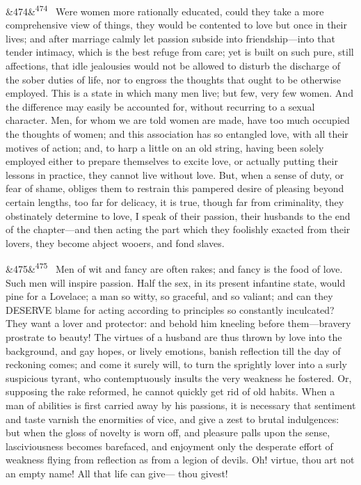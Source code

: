 \documentclass[12pt]{article}
\newcommand{\para}[1][]{\par\noindent\ifx&#1&\else\textsuperscript{\footnotesize #1}~\fi}
\begin{document}
\para[474] Were women more rationally educated, could they take a more comprehensive view of things, they would be contented to love but once in their lives; and after marriage calmly let passion subside into friendship---into that tender intimacy, which is the best refuge from care; yet is built on such pure, still affections, that idle jealousies would not be allowed to disturb the discharge of the sober duties of life, nor to engross the thoughts that ought to be otherwise employed. This is a state in which many men live; but few, very few women. And the difference may easily be accounted for, without recurring to a sexual character. Men, for whom we are told women are made, have too much occupied the thoughts of women; and this association has so entangled love, with all their motives of action; and, to harp a little on an old string, having been solely employed either to prepare themselves to excite love, or actually putting their lessons in practice, they cannot live without love. But, when a sense of duty, or fear of shame, obliges them to restrain this pampered desire of pleasing beyond certain lengths, too far for delicacy, it is true, though far from criminality, they obstinately determine to love, I speak of their passion, their husbands to the end of the chapter---and then acting the part which they foolishly exacted from their lovers, they become abject wooers, and fond slaves.

\para[475] Men of wit and fancy are often rakes; and fancy is the food of love. Such men will inspire passion. Half the sex, in its present infantine state, would pine for a Lovelace; a man so witty, so graceful, and so valiant; and can they DESERVE blame for acting according to principles so constantly inculcated? They want a lover and protector: and behold him kneeling before them---bravery prostrate to beauty! The virtues of a husband are thus thrown by love into the background, and gay hopes, or lively emotions, banish reflection till the day of reckoning comes; and come it surely will, to turn the sprightly lover into a surly suspicious tyrant, who contemptuously insults the very weakness he fostered. Or, supposing the rake reformed, he cannot quickly get rid of old habits. When a man of abilities is first carried away by his passions, it is necessary that sentiment and taste varnish the enormities of vice, and give a zest to brutal indulgences: but when the gloss of novelty is worn off, and pleasure palls upon the sense, lasciviousness becomes barefaced, and enjoyment only the desperate effort of weakness flying from reflection as from a legion of devils. Oh! virtue, thou art not an empty name! All that life can give--- thou givest!
\end{document}
